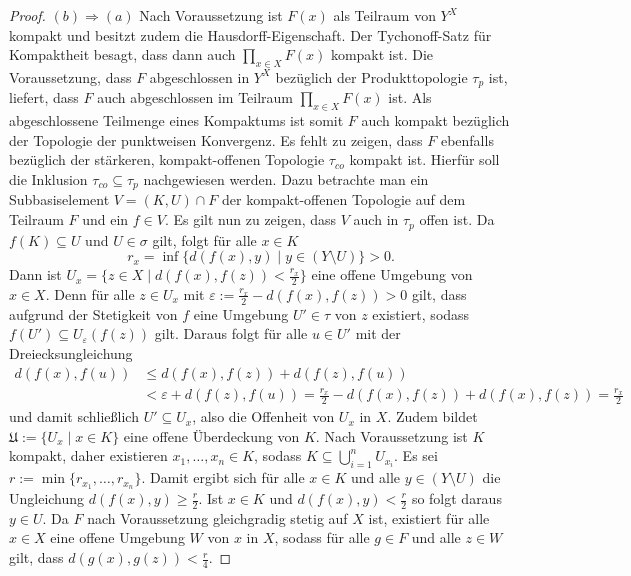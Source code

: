 \begin{proof}
  $(b) \Rightarrow (a)$
  Nach Voraussetzung ist $F(x)$ als Teilraum von $Y^X$ kompakt und besitzt zudem die Hausdorff-Eigenschaft.
  Der Tychonoff-Satz für Kompaktheit besagt, dass dann auch $\prod_{x \in X} F(x)$ kompakt ist.
  Die Voraussetzung, dass $F$ abgeschlossen in $Y^X$ bezüglich der Produkttopologie $\tau_p$ ist, liefert, dass $F$ auch abgeschlossen im Teilraum $\prod_{x \in X} F(x)$ ist.
  Als abgeschlossene Teilmenge eines Kompaktums ist somit $F$ auch kompakt bezüglich der Topologie der punktweisen Konvergenz.
  Es fehlt zu zeigen, dass $F$ ebenfalls bezüglich der stärkeren, kompakt-offenen Topologie $\tau_{co}$ kompakt ist.
  Hierfür soll die Inklusion $\tau_{co} \subseteq \tau_p$ nachgewiesen werden.
  Dazu betrachte man ein Subbasiselement $V = (K,U) \cap F$ der kompakt-offenen Topologie auf dem Teilraum $F$ und ein $f \in V$.
  Es gilt nun zu zeigen, dass $V$ auch in $\tau_p$ offen ist.
  Da $f(K) \subseteq U$ und $U \in \sigma$ gilt, folgt für alle $x \in K$
  \begin{displaymath}
    r_x = \inf\{d(f(x),y) \mid y \in (Y \setminus U) \} > 0.
  \end{displaymath}
  Dann ist $U_x = \{ z \in X \mid d(f(x),f(z)) < \tfrac{r_x}{2}\}$ eine offene Umgebung von $x \in X$.
  Denn für alle $z \in U_x$ mit $\varepsilon := \tfrac{r_x}{2} - d(f(x),f(z)) > 0$ gilt, dass aufgrund der Stetigkeit von $f$ eine Umgebung $U' \in \tau$ von $z$ existiert, sodass $f(U') \subseteq U_\varepsilon(f(z))$ gilt.
  Daraus folgt für alle $u \in U'$ mit der Dreiecksungleichung
  \begin{align*}
    d(f(x),f(u)) &\leq d(f(x),f(z)) + d(f(z),f(u)) \\
                 &< \varepsilon + d(f(z),f(u)) = \frac{r_x}{2} - d(f(x),f(z)) + d(f(x),f(z)) =  \frac{r_x}{2}
  \end{align*}
  und damit schließlich $U' \subseteq U_x$, also die Offenheit von $U_x$ in $X$.
  Zudem bildet $\mathfrak{U} := \{U_x \mid x \in K\}$ eine offene Überdeckung von $K$. 
  Nach Voraussetzung ist $K$ kompakt, daher existieren $x_1,\dots,x_n \in K$, sodass $K \subseteq \bigcup_{i=1}^n U_{x_i}$.
  Es sei $r:= \min\{r_{x_1},\dots,r_{x_n}\}$. 
  Damit ergibt sich für alle $x \in K$ und alle $y \in (Y \setminus U)$ die Ungleichung $d(f(x),y) \geq \tfrac{r}{2}$.
  Ist $x \in K$ und $d(f(x),y) < \tfrac{r}{2}$ so folgt daraus $y \in U$.
  Da $F$ nach Voraussetzung gleichgradig stetig auf $X$ ist, existiert für alle $x \in X$ eine offene Umgebung $W$ von $x$ in $X$, sodass für alle $g \in F$ und alle $z \in W$ gilt, dass $d(g(x),g(z)) < \tfrac{r}{4}$.

\end{proof}
